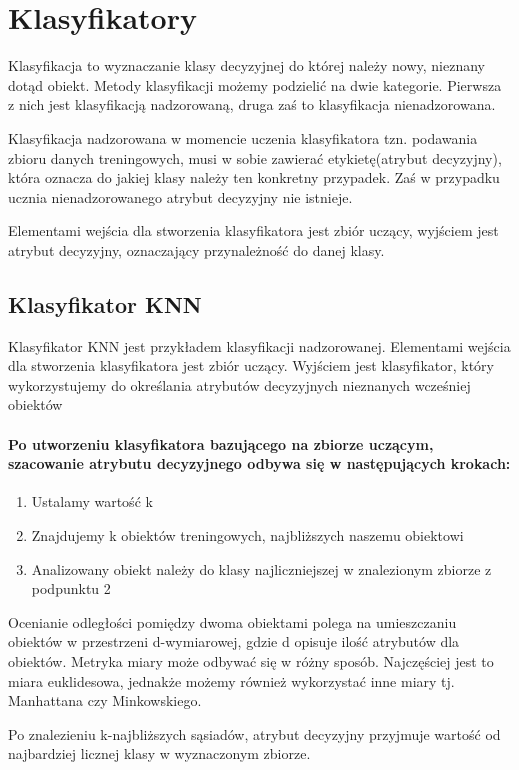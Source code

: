 \documentclass[a4paper,12pt,twoside,openany]{report}
\begin{document}
\section{Klasyfikatory}
Klasyfikacja to wyznaczanie klasy decyzyjnej do której należy nowy, nieznany dotąd obiekt. Metody klasyfikacji możemy podzielić na dwie kategorie. Pierwsza z nich jest  klasyfikacją nadzorowaną, druga zaś to klasyfikacja nienadzorowana. 

Klasyfikacja nadzorowana w momencie uczenia klasyfikatora tzn. podawania zbioru danych treningowych, musi w sobie zawierać etykietę(atrybut decyzyjny), która oznacza do jakiej klasy należy ten konkretny przypadek. Zaś w przypadku ucznia nienadzorowanego atrybut decyzyjny nie istnieje.

Elementami wejścia dla stworzenia klasyfikatora jest zbiór uczący, wyjściem jest atrybut decyzyjny, oznaczający przynależność do danej klasy.

\subsection{Klasyfikator KNN}
Klasyfikator KNN jest przykładem klasyfikacji nadzorowanej. Elementami wejścia dla stworzenia klasyfikatora jest zbiór uczący. Wyjściem jest klasyfikator, który wykorzystujemy do określania atrybutów decyzyjnych nieznanych wcześniej obiektów

\paragraph{Po utworzeniu klasyfikatora bazującego na zbiorze uczącym, szacowanie atrybutu decyzyjnego odbywa się w następujących krokach: }
\begin{enumerate}
	\item Ustalamy wartość k
	\item Znajdujemy k obiektów treningowych, najbliższych naszemu obiektowi
	\item Analizowany obiekt należy do klasy najliczniejszej w znalezionym zbiorze z podpunktu 2
\end{enumerate}

Ocenianie odległości pomiędzy dwoma obiektami polega na umieszczaniu obiektów w przestrzeni d-wymiarowej, gdzie d opisuje ilość atrybutów dla obiektów. Metryka miary może odbywać się w różny sposób. Najczęściej jest to miara euklidesowa, jednakże możemy również wykorzystać inne miary tj. Manhattana czy Minkowskiego. 

Po znalezieniu k-najbliższych sąsiadów, atrybut decyzyjny przyjmuje wartość od najbardziej licznej klasy w wyznaczonym zbiorze.
\end{document}
